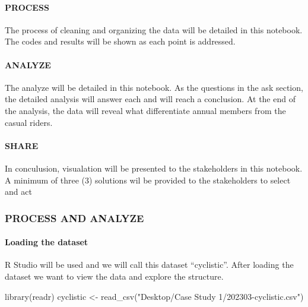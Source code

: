 \documentclass[
]{article}
\newenvironment{Shaded}{\begin{snugshade}}{\end{snugshade}}
\newcommand{\FunctionTok}[1]{\textcolor[rgb]{0.00,0.00,0.00}{#1}}
\newcommand{\NormalTok}[1]{#1}
\newcommand{\OtherTok}[1]{\textcolor[rgb]{0.56,0.35,0.01}{#1}}
\newcommand{\StringTok}[1]{\textcolor[rgb]{0.31,0.60,0.02}{#1}}
\begin{document}
\hypertarget{process}{%
\paragraph{PROCESS}\label{process}}

The process of cleaning and organizing the data will be detailed in this
notebook. The codes and results will be shown as each point is
addressed.

\hypertarget{analyze}{%
\paragraph{ANALYZE}\label{analyze}}

The analyze will be detailed in this notebook. As the questions in the
ask section, the detailed analysis will answer each and will reach a
conclusion. At the end of the analysis, the data will reveal what
differentiate annual members from the casual riders.

\hypertarget{share}{%
\paragraph{SHARE}\label{share}}

In conculusion, visualation will be presented to the stakeholders in
this notebook. A minimum of three (3) solutions wil be provided to the
stakeholders to select and act

\hypertarget{process-and-analyze}{%
\subsubsection{PROCESS AND ANALYZE}\label{process-and-analyze}}

\hypertarget{loading-the-dataset}{%
\paragraph{Loading the dataset}\label{loading-the-dataset}}

R Studio will be used and we will call this dataset ``cyclistic''. After
loading the dataset we want to view the data and explore the structure.

\begin{Shaded}
\begin{Highlighting}[]
\FunctionTok{library}\NormalTok{(readr)}
\NormalTok{cyclistic }\OtherTok{\textless{}{-}} \FunctionTok{read\_csv}\NormalTok{(}\StringTok{"Desktop/Case Study 1/202303{-}cyclistic.csv"}\NormalTok{)}
\end{Highlighting}
\end{Shaded}
\end{document}
